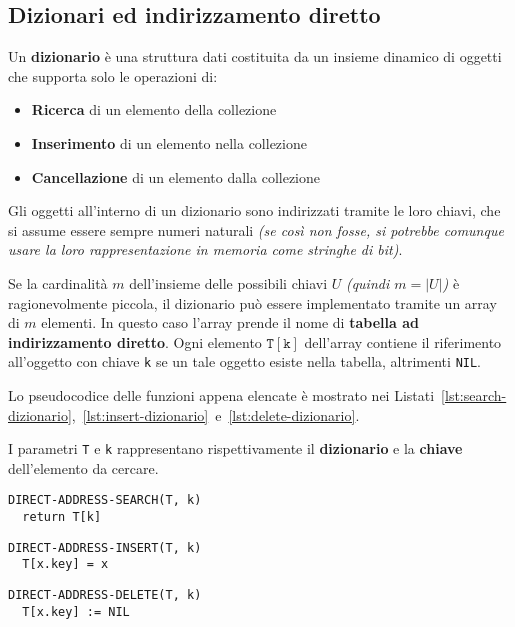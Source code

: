 \documentclass[italian, 10pt]{article}
\begin{document}
\subsection{Dizionari ed indirizzamento diretto}

Un \textbf{dizionario} è una struttura dati costituita da un insieme dinamico di oggetti che supporta solo le operazioni di:

\begin{itemize}
  \item \textbf{Ricerca} di un elemento della collezione
  \item \textbf{Inserimento} di un elemento nella collezione
  \item \textbf{Cancellazione} di un elemento dalla collezione
\end{itemize}

Gli oggetti all'interno di un dizionario sono indirizzati tramite le loro chiavi, che si assume essere sempre numeri naturali \textit{(se così non fosse, si potrebbe comunque usare la loro rappresentazione in memoria come stringhe di bit)}.

Se la cardinalità \(m\) dell'insieme delle possibili chiavi \(U\) \textit{(quindi \(m = |U|\))} è ragionevolmente piccola, il dizionario può essere implementato tramite un array di \(m\) elementi.
In questo caso l'array prende il nome di \textbf{tabella ad indirizzamento diretto}.
Ogni elemento \(\texttt{T}[\texttt{k}]\) dell'array contiene il riferimento all'oggetto con chiave \texttt{k} se un tale oggetto esiste nella tabella, altrimenti \texttt{NIL}.

\bigskip
Lo pseudocodice delle funzioni appena elencate è mostrato nei Listati~\ref{lst:search-dizionario},~\ref{lst:insert-dizionario}~e~\ref{lst:delete-dizionario}.

I parametri \texttt{T} e \texttt{k} rappresentano rispettivamente il \textbf{dizionario} e la \textbf{chiave} dell'elemento da cercare.

\begin{lstlisting}[style=pseudocode, caption={Ricerca}, label={lst:search-dizionario}]
DIRECT-ADDRESS-SEARCH(T, k)
  return T[k]
  \end{lstlisting}

\begin{lstlisting}[style=pseudocode, caption={Inserzione}, label={lst:insert-dizionario}]
DIRECT-ADDRESS-INSERT(T, k)
  T[x.key] = x
  \end{lstlisting}

\begin{lstlisting}[style=pseudocode, caption={Cancellazione}, label={lst:delete-dizionario}]
DIRECT-ADDRESS-DELETE(T, k)
  T[x.key] := NIL
  \end{lstlisting}
\end{document}
